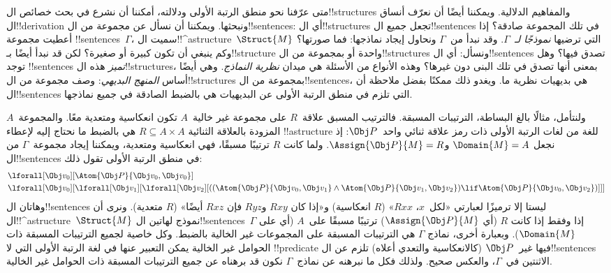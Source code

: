\documentclass[../../../include/open-logic-section]{subfiles}
\begin{document}


متى عرّفنا نحو منطق الرتبة الأولى ودلالته، أمكننا أن نشرع في بحث خصائص
ال!!{structure}s والمفاهيم الدلالية. ويمكننا أيضًا أن نعرّف أنساق
ال!!{derivation} ونبحثها. ويمكننا أن نسأل عن مجموعة من
ال!!{sentence}s: أي ال!!{structure}s تجعل جميع ال!!{sentence}s في
تلك المجموعة صادقة؟ إذا أعطيت مجموعة !!{sentence}s~$\Gamma$، سميت
ال!!^a{structure}~$\Struct{M}$ التي ترضيها \emph{نموذجًا
لـ~$\Gamma$}. وقد نبدأ من~$\Gamma$ ونحاول إيجاد نماذجها: فما صورتها؟
وكم ينبغي أن تكون كبيرة أو صغيرة؟ لكن قد نبدأ أيضًا بـ!!{structure}
واحدة أو بمجموعة من ال!!{structure}s ونسأل: أي ال!!{sentence}s تصدق
فيها؟ وهل توجد !!{sentence}s \emph{تميز} هذه ال!!{structure}s، بمعنى
أنها تصدق في تلك البنى دون غيرها؟ وهذه الأنواع من الأسئلة هي ميدان
\emph{نظرية النماذج}. وهي أيضًا أساس \emph{المنهج البديهي}: وصف
مجموعة من ال!!{structure}s بمجموعة من ال!!{sentence}s، هي بديهيات
نظرية ما. ويغدو ذلك ممكنًا بفضل ملاحظة أن ال!!{sentence}s التي تلزم في منطق
الرتبة الأولى عن البديهيات هي بالضبط الصادقة في جميع نماذجها.

ولنتأمل، مثالًا بالغ البساطة، الترتيبات المسبقة. فالترتيب المسبق
علاقة~$R$ على مجموعة غير خالية~$A$ تكون انعكاسية ومتعدية معًا. والمجموعة~$A$
المزودة بالعلاقة الثنائية $R \subseteq A \times A$ هي بالضبط ما
نحتاج إليه لإعطاء !!a{structure} للغة من لغات الرتبة الأولى ذات رمز
علاقة ثنائي واحد~$\Obj P$: إذ نجعل
$\Domain{M} = A$ و$\Assign{\Obj P}{M} = R$. ولما كانت $R$ ترتيبًا
مسبقًا، فهي انعكاسية ومتعدية، ويمكننا إيجاد مجموعة~$\Gamma$ من
ال!!{sentence}s في منطق الرتبة الأولى تقول ذلك:
\begin{align*}
  & \lforall[\Obj v_0][\Atom{\Obj P}{\Obj v_0,\Obj v_0}]\\
  & \lforall[\Obj v_0][\lforall[\Obj v_1][\lforall[\Obj v_2][((\Atom{\Obj P}{\Obj v_0,\Obj v_1} \land \Atom{\Obj P}{\Obj v_1,\Obj v_2}) \lif \Atom{\Obj P}{\Obj v_0,\Obj v_2})]]]
\end{align*}
وهاتان ال!!{sentence}s ليستا إلا ترميزًا لعبارتي «لكل~$x$،
$Rxx$» ($R$ انعكاسية) و«إذا كان $Rxy$ و$Ryz$ فإن $Rxz$ أيضًا»
($R$ متعدية). ونرى أن ال!!^a{structure}~$\Struct{M}$ نموذج لهاتين
ال!!{sentence}s~$\Gamma$ إذا وفقط إذا كانت $R$ (أي
$\Assign{\Obj P}{M}$) ترتيبًا مسبقًا على~$A$ (أي على
$\Domain{M}$). وبعبارة أخرى، نماذج $\Gamma$ هي الترتيبات المسبقة على
المجموعات غير الخالية بالضبط. وكل خاصية لجميع الترتيبات المسبقة ذات
الحوامل غير الخالية يمكن التعبير عنها في لغة
الرتبة الأولى التي لا !!{predicate} فيها غير~$\Obj P$ (كالانعكاسية
والتعدي أعلاه) تلزم عن ال!!{sentence}s الاثنتين في~$\Gamma$، والعكس
صحيح. ولذلك فكل ما نبرهنه عن نماذج~$\Gamma$ نكون قد برهناه عن جميع
الترتيبات المسبقة ذات الحوامل غير الخالية.
\end{document}
